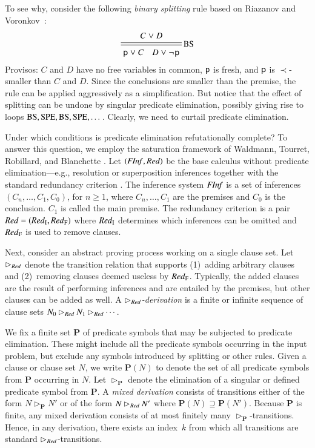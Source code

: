 \begin{rep}
To see why, consider the following \emph{binary splitting} rule
based on Riazanov and Vo\-ro\-nkov~\cite{riazanov-voronkov-2001}:
%
\[\namedsimp{BS}{C \cor D}{\cst{p} \cor C \quad D \cor \neglit{\cst{p}}}\]
%
Provisos: $C$ and $D$ have no free variables in common, $\mathsf{p}$ is fresh, and
$\mathsf{p}$ is $\prec$-smaller than $C$ and $D$. Since the conclusions are
smaller than the premise, the rule can be applied aggressively as a
simplification. But notice that the effect of splitting can be undone by
singular predicate elimination, possibly giving rise to loops
$\textsc{BS}, \textsc{SPE}, \textsc{BS}, \textsc{SPE}, \dotsc$.
Clearly, we need to curtail predicate elimination.

Under which conditions is predicate elimination refutationally complete? To
answer this question, we employ the saturation framework of Waldmann, Tourret,
Robillard, and Blanchette \cite{wtrb-20-sat-framework}. Let
$(\mathit{FInf}, \mathit{Red})$ be the base calculus without predicate elimination---e.g.,
resolution or superposition inferences together with the standard
redundancy criterion \cite[Sect.~4.2]{bg-01-resolution}. The
inference system $\mathit{FInf}$ is a set of inferences $(C_n,\ldots,C_1,C_0)$, for $n
\ge 1$, where $C_n,\ldots,C_1$ are the premises and $C_0$ is the conclusion.
$C_1$ is called the main premise. %
The redundancy criterion is a pair $\mathit{Red} = (\mathit{Red}_\mathrm{I}, \mathit{Red}_\mathrm{F})$ where $\mathit{Red}_\mathrm{I}$
determines which inferences can be omitted and $\mathit{Red}_\mathrm{F}$ is used to remove
clauses.

Next, consider an abstract proving process working on a single clause set.
Let $\rhd_{\mathit{Red}}$ denote the transition relation that supports (1)~adding
arbitrary clauses and (2)~removing clauses deemed useless by $\mathit{Red}_\mathrm{F}$.
Typically, the added clauses are the result of performing inferences and are
entailed by the premises, but other clauses can be added as well. A
\emph{$\rhd_{\mathit{Red}}$-derivation} is a finite or infinite sequence of clause sets
$N_0 \rhd_{\mathit{Red}} N_1 \rhd_{\mathit{Red}} \cdots$.

We fix a finite set $\mathbf{P}$ of predicate symbols that may be subjected to
predicate elimination. These might include all the predicate symbols occurring
in the input problem, but exclude any symbols introduced by splitting or other
rules. Given a clause or clause set $N$, we write $\mathbf{P}(N)$ to denote the
set of all predicate symbols from $\mathbf{P}$ occurring in $N.$
%
Let $\rhd_\mathbf{P}$ denote the elimination of a
singular or defined predicate symbol from $\mathbf{P}$. A \emph{mixed
derivation} consists of transitions either of the form $N
\rhd_\mathbf{P} N'$ or of the form $N \rhd_{\mathit{Red}} N'$ where
$\mathbf{P}(N) \supseteq \mathbf{P}(N')$.
Because $\mathbf{P}$ is finite, any mixed derivation consists of at most
finitely many $\rhd_\mathbf{P}$-transitions. Hence, in any derivation,
there exists an index~$k$ from which all transitions are standard
${\rhd}_{\mathit{Red}}$-transitions.


\end{rep}
